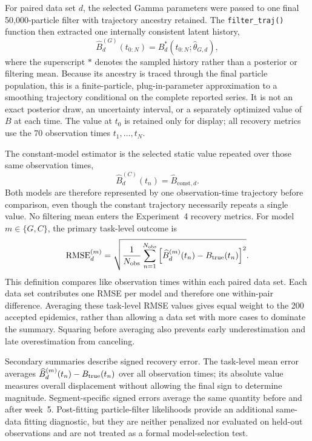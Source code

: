 For paired data set \(d\), the selected Gamma parameters were passed to one
final 50,000-particle filter with trajectory ancestry retained.  The
\texttt{filter\_traj()} function then extracted one internally consistent
latent history,
\begin{equation}
\widehat B^{(G)}_d(t_{0:N})
=B^{*}_d(t_{0:N};\widehat\theta_{G,d}),
\label{eq:bhat}
\end{equation}
where the superscript \(*\) denotes the sampled history rather than a posterior
or filtering mean.  Because its ancestry is traced through the final particle
population, this is a finite-particle, plug-in-parameter approximation to a
smoothing trajectory conditional on the complete reported series.  It is not
an exact posterior draw, an uncertainty interval, or a separately optimized
value of \(B\) at each time.  The value at \(t_0\) is retained only for display;
all recovery metrics use the 70 observation times \(t_1,\ldots,t_N\).

The constant-model estimator is the selected static value repeated over those
same observation times,
\[
\widehat B^{(C)}_d(t_n)=\widehat B_{\mathrm{const},d}.
\]
Both models are therefore represented by one observation-time trajectory
before comparison, even though the constant trajectory necessarily repeats a
single value.  No filtering mean enters the Experiment~4 recovery metrics.
For model \(m\in\{G,C\}\), the primary task-level outcome is
\begin{equation}
\operatorname{RMSE}^{(m)}_d
=
\sqrt{
\frac{1}{N_{\mathrm{obs}}}
\sum_{n=1}^{N_{\mathrm{obs}}}
\left[
\widehat B^{(m)}_d(t_n)-B_{\mathrm{true}}(t_n)
\right]^2
}.
\label{eq:rmse}
\end{equation}
This definition compares like observation times within each paired data set.
Each data set contributes one RMSE per model and therefore one within-pair
difference.  Averaging these task-level RMSE values gives equal weight to the
200 accepted epidemics, rather than allowing a data set with more cases to
dominate the summary.  Squaring before averaging also prevents early
underestimation and late overestimation from canceling.

Secondary summaries describe signed recovery error.  The task-level mean error
averages \(\widehat B^{(m)}_d(t_n)-B_{\mathrm{true}}(t_n)\) over all observation times;
its absolute value measures overall displacement without allowing the final
sign to determine magnitude.  Segment-specific signed errors average the same
quantity before and after week~5.  Post-fitting particle-filter likelihoods
provide an additional same-data fitting diagnostic, but they are neither
penalized nor evaluated on held-out observations and are not treated as a
formal model-selection test.
